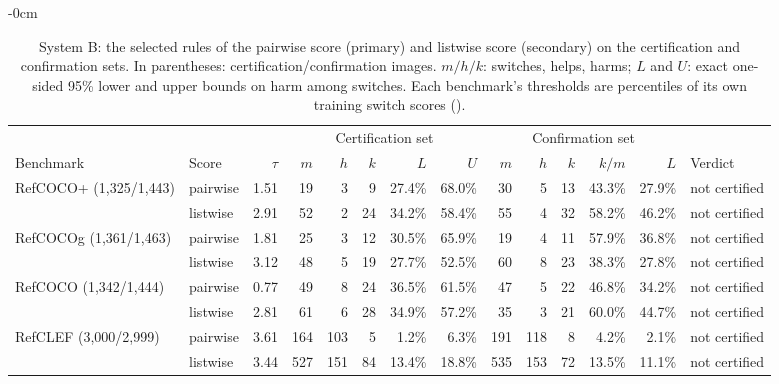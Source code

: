 \begin{table}[H]
\begin{adjustwidth}{-\extralength}{0cm}
\caption{System B: the selected rules of the pairwise score
(primary) and listwise score (secondary) on the certification and
confirmation sets.  In parentheses: certification/confirmation images.
$m/h/k$: switches, helps, harms; $L$ and $U$: exact one-sided 95\% lower and
upper bounds on harm among switches.  Each benchmark's thresholds are
percentiles of its own training switch scores ().\label{tab:sysb-scores}}
\centering
\small
\setlength{\tabcolsep}{3.5pt}
\begin{tabular}{@{}llrrrrrrrrrrrl@{}}
\toprule
& & & \multicolumn{5}{c}{Certification set} & \multicolumn{5}{c}{Confirmation set} & \\
\cmidrule(lr){4-8}\cmidrule(lr){9-13}
Benchmark & Score & $\tau$ & $m$ & $h$ & $k$ & $L$ & $U$ & $m$ & $h$ & $k$ & $k/m$ & $L$ & Verdict \\
\midrule
RefCOCO+ (1{,}325/1{,}443) & pairwise & 1.51 & 19 & 3 & 9 & 27.4\% & 68.0\% & 30 & 5 & 13 & 43.3\% & 27.9\% & not certified \\
 & listwise & 2.91 & 52 & 2 & 24 & 34.2\% & 58.4\% & 55 & 4 & 32 & 58.2\% & 46.2\% & not certified \\
\midrule
RefCOCOg (1{,}361/1{,}463) & pairwise & 1.81 & 25 & 3 & 12 & 30.5\% & 65.9\% & 19 & 4 & 11 & 57.9\% & 36.8\% & not certified \\
 & listwise & 3.12 & 48 & 5 & 19 & 27.7\% & 52.5\% & 60 & 8 & 23 & 38.3\% & 27.8\% & not certified \\
\midrule
RefCOCO (1{,}342/1{,}444) & pairwise & 0.77 & 49 & 8 & 24 & 36.5\% & 61.5\% & 47 & 5 & 22 & 46.8\% & 34.2\% & not certified \\
 & listwise & 2.81 & 61 & 6 & 28 & 34.9\% & 57.2\% & 35 & 3 & 21 & 60.0\% & 44.7\% & not certified \\
\midrule
RefCLEF (3{,}000/2{,}999) & pairwise & 3.61 & 164 & 103 & 5 & 1.2\% & 6.3\% & 191 & 118 & 8 & 4.2\% & 2.1\% & not certified \\
 & listwise & 3.44 & 527 & 151 & 84 & 13.4\% & 18.8\% & 535 & 153 & 72 & 13.5\% & 11.1\% & not certified \\
\bottomrule
\end{tabular}
\end{adjustwidth}
\end{table}
